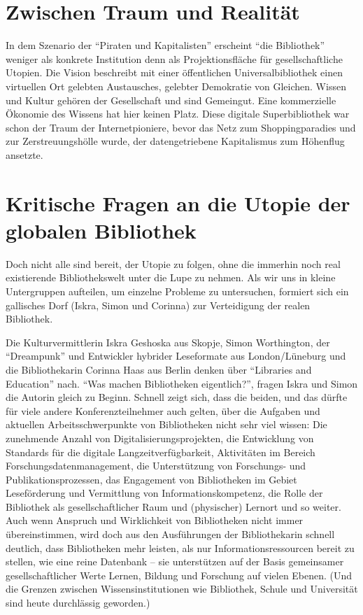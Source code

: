 \documentclass[a4paper,
fontsize=11pt,
oneside,
numbers=noperiodatend,
parskip=half-,
bibliography=totoc,
final
]{scrartcl}
\begin{document}
\section*{Zwischen Traum und
Realität}\label{zwischen-traum-und-realituxe4t}

In dem Szenario der \enquote{Piraten und Kapitalisten} erscheint
\enquote{die Bibliothek} weniger als konkrete Institution denn als
Projektionsfläche für gesellschaftliche Utopien. Die Vision beschreibt
mit einer öffentlichen Universalbibliothek einen virtuellen Ort gelebten
Austausches, gelebter Demokratie von Gleichen. Wissen und Kultur gehören
der Gesellschaft und sind Gemeingut. Eine kommerzielle Ökonomie des
Wissens hat hier keinen Platz. Diese digitale Superbibliothek war schon
der Traum der Internetpioniere, bevor das Netz zum Shoppingparadies und
zur Zerstreuungshölle wurde, der datengetriebene Kapitalismus zum
Höhenflug ansetzte.

\section*{Kritische Fragen an die Utopie der globalen
Bibliothek}\label{kritische-fragen-an-die-utopie-der-globalen-bibliothek}

Doch nicht alle sind bereit, der Utopie zu folgen, ohne die immerhin
noch real existierende Bibliothekswelt unter die Lupe zu nehmen. Als wir
uns in kleine Untergruppen aufteilen, um einzelne Probleme zu
untersuchen, formiert sich ein gallisches Dorf (Iskra, Simon und
Corinna) zur Verteidigung der realen Bibliothek.

Die Kulturvermittlerin Iskra Geshoska aus Skopje, Simon Worthington, der
\enquote{Dreampunk} und Entwickler hybrider Leseformate aus
London/Lüneburg und die Bibliothekarin Corinna Haas aus Berlin denken
über \enquote{Libraries and Education} nach. \enquote{Was machen
Bibliotheken eigentlich?}, fragen Iskra und Simon die Autorin gleich zu
Beginn. Schnell zeigt sich, dass die beiden, und das dürfte für viele
andere Konferenzteilnehmer auch gelten, über die Aufgaben und aktuellen
Arbeitsschwerpunkte von Bibliotheken nicht sehr viel wissen: Die
zunehmende Anzahl von Digitalisierungsprojekten, die Entwicklung von
Standards für die digitale Langzeitverfügbarkeit, Aktivitäten im Bereich
Forschungsdatenmanagement, die Unterstützung von Forschungs- und
Publikationsprozessen, das Engagement von Bibliotheken im Gebiet
Leseförderung und Vermittlung von Informationskompetenz, die Rolle der
Bibliothek als gesellschaftlicher Raum und (physischer) Lernort und so
weiter. Auch wenn Anspruch und Wirklichkeit von Bibliotheken nicht immer
übereinstimmen, wird doch aus den Ausführungen der Bibliothekarin
schnell deutlich, dass Bibliotheken mehr leisten, als nur
Informationsressourcen bereit zu stellen, wie eine reine Datenbank --
sie unterstützen auf der Basis gemeinsamer gesellschaftlicher Werte
Lernen, Bildung und Forschung auf vielen Ebenen. (Und die Grenzen
zwischen Wissensinstitutionen wie Bibliothek, Schule und Universität
sind heute durchlässig geworden.)
\end{document}
